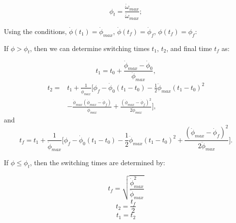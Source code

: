 \documentclass[letterpaper, preprint, paper,11pt]{AAS}	%
\begin{document}
	 \begin{equation}\label{phi_t}
		 \phi_t = \frac{\dot{\omega}_{max}}{\ddot{\omega}_{max}};
	 \end{equation}
	 
	 Using the conditions, $\dot{\phi}(t_1)=\dot{\phi}_{max}$, $\dot{\phi}(t_f)=\dot{\phi}_f$, $\phi(t_f)=\phi_f$: 
	 
	 If $\phi > \phi_t$, then we can determine switching times $t_1$, $t_2$, and final time $t_f$ as:
	
	\begin{equation}\label{t1cons}
	t_1=t_0+\frac{\dot{\phi}_{max}-\dot{\phi}_0}{\ddot{\phi}_{max}},
	\end{equation}
	\begin{equation}\label{t2cons}
	\begin{split}
	t_2=&t_1+\frac{1}{\dot{\phi}_{max}}\Big[ \phi_f-\dot{\phi}_0(t_1-t_0)-\frac{1}{2}\ddot{\phi}_{max}(t_1-t_0)^2\\
	&-\frac{\dot{\phi}_{max}(\dot{\phi}_{max}-\dot{\phi}_f)}{\ddot{\phi}_{max}}+\frac{(\dot{\phi}_{max}-\dot{\phi}_f)^2}{2\ddot{\phi}_{max}} \Big],
	\end{split}
	\end{equation}
	and
	\begin{equation}\label{tfcons}
	t_f=t_1+\frac{1}{\dot{\phi}_{max}}\Big[ \phi_f-\dot{\phi}_0(t_1-t_0)-\frac{1}{2}\ddot{\phi}_{max}(t_1-t_0)^2+\frac{(\dot{\phi}_{max}-\dot{\phi}_f)^2}{2\ddot{\phi}_{max}} \Big].
	\end{equation}
	
	If $\phi \leq \phi_t$, then the switching times are determined by: 
	
	\begin{equation}\label{tfcons_phit}
		t_f = \sqrt{\frac{\dot{\phi}_{max}^2}{\ddot{\phi}_{max}}}
	\end{equation}
	\begin{equation}\label{t2cons_phit}
		t_2 = \frac{t_f}{2}
	\end{equation}
	\begin{equation}\label{t1cons_phit}
		t_1 = t_2 
	\end{equation}
		
\end{document}

